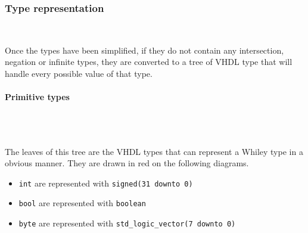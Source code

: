 \documentclass[10pt,a4paper]{article}
\newcommand{\code}{\texttt}
\renewcommand{\indent}{~\\\vspace{-.8cm}}
\begin{document}
%
%
%
%
%
%



\subsubsection{Type representation} \indent
\label{Repr}

Once the types have been simplified, if they do not contain any intersection, negation or infinite types, they are converted to a tree of VHDL type that will handle every possible value of that type. 

\paragraph{Primitive types}~\\\indent

The leaves of this tree are the VHDL types that can represent a Whiley type in a obvious manner. They are drawn in red on the following diagrams.

\begin{itemize}
	\item \code{int} are represented with \code{signed(31 downto 0)}
	\item \code{bool} are represented with \code{boolean}
	\item \code{byte} are represented with \code{std\_logic\_vector(7 downto 0)}
\end{itemize}
\end{document}
